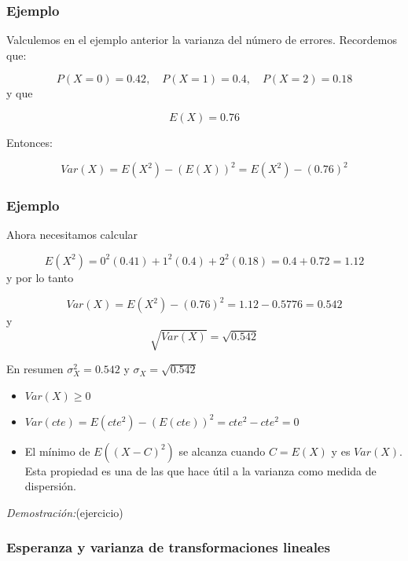 \documentclass[handout]{beamer}\usepackage[]{graphicx}\usepackage[]{color}
\renewcommand{\geq}{\geqslant}
\theoremstyle{plain}
\theoremstyle{definition}
\begin{document}
\begin{frame}

\frametitle{Ejemplo}
   Valculemos en  el ejemplo anterior la varianza del número de errores. Recordemos que:
   
    $$P(X=0)=0.42,\quad P(X=1)=0.4, \quad P(X=2)=0.18$$
    y que
    
    $$E(X)=0.76$$

    Entonces:
    
    $$Var(X)=E(X^2)-(E(X))^2 = E(X^2)-(0.76)^2$$
\end{frame}

\begin{frame}

\frametitle{Ejemplo}
  Ahora necesitamos calcular 
  
  $$E(X^2)= 0^2 (0.41)+ 1^2 (0.4)+ 2^2 (0.18)=0.4+0.72=1.12$$
  y por lo tanto
  
  $$Var(X)= E(X^2)-(0.76)^2=1.12-0.5776=0.542$$
  y $$\sqrt{Var(X)}=\sqrt{0.542}$$

  En resumen $\sigma_{X}^2=0.542$ y $\sigma_{X}=\sqrt{0.542}$
     
\end{frame}

\begin{frame}

    \begin{itemize}
    \item $Var(X)\geq 0$
    \item $Var(cte)=E(cte^2)-(E(cte))^2= cte^2 - cte^2=0$
    \item El mínimo de $E((X-C)^2)$ se alcanza cuando $C=E(X)$ y es $Var(X)$. Esta
    propiedad es una de las que hace útil a la varianza como medida de dispersión.
    \end{itemize}


       \textit{Demostración:}(ejercicio)


\end{frame}


\subsubsection{Esperanza y varianza de transformaciones lineales}
\end{document}
